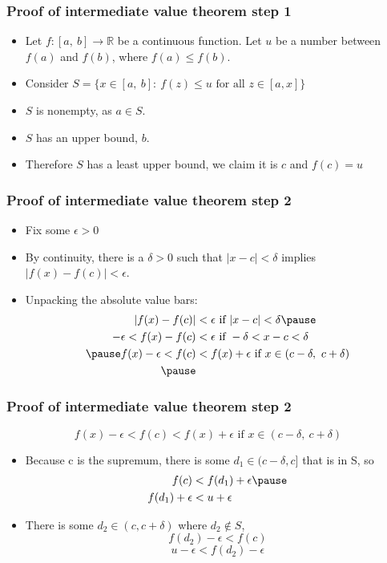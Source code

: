 \documentclass{beamer}
\numberwithin{equation}{section}
\begin{document}
\begin{frame}
\frametitle{Proof of intermediate value theorem step 1}
\begin{itemize}
\item[] Let $f: [a,\ b] \rightarrow \mathbb{R}$ be a continuous function.  Let $u$ be a number between  $f(a)$ and $f(b)$, where $f(a)\leq f(b)$.\pause
\item[] Consider $S=\{x \in [a,\ b]:\ f(z)\leq u\text{ for all } z\in[a, x]\}$\pause
\item[] $S$ is nonempty, as $a\in S$.\pause
\item[] $S$ has an upper bound, $b$. \pause
\item[] Therefore $S$ has a least upper bound, we claim it is $c$ and $f(c)=u$
\end{itemize}

\end{frame}

\begin{frame}
\frametitle{Proof of intermediate value theorem step 2}
\begin{itemize}
\item[]  Fix some $\epsilon>0$
\item By continuity, there is a $\delta>0$ such that $|x-c|<\delta$ implies $|f(x)-f(c)|<\epsilon$.\pause
\item Unpacking the absolute value bars:
\begin{align*} 
|f(x)-f(c)| &<\epsilon \text{  if   }|x-c|<\delta \pause\\
-\epsilon<f(x)-f(c)&<\epsilon\text{  if   } -\delta<x-c<\delta\\ \pause
f(x)-\epsilon< f(c)&<f(x)+\epsilon\text{  if   }  x\in (c-\delta,\ c+\delta)\\ \pause
\end{align*}
\end{itemize}
\end{frame}

\begin{frame}
\frametitle{Proof of intermediate value theorem step 2}
$$f(x)-\epsilon< f(c)<f(x)+\epsilon\text{  if   }  x\in (c-\delta,\ c+\delta)$$
\begin{itemize}
\item Because c is the supremum, there is some $d_1\in (c-\delta, c]$ that is in S, so 
\begin{align*} 
f(c)&<f(d_1)+\epsilon\pause\\
f(d_1)+\epsilon&<u+\epsilon
\end{align*}
\pause
\item There is some $d_2\in (c, c+\delta)$ where $d_2 \notin S$, 
$$f(d_2)-\epsilon< f(c)$$\pause
$$u-\epsilon<f(d_2)-\epsilon$$
\end{itemize}
\end{frame}
\end{document}
